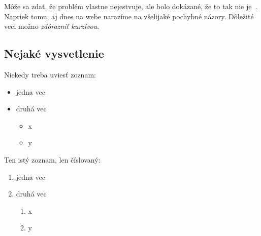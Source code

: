 \documentclass[12pt,twoside,english,a4paper]{article}
\begin{document}
Môže sa zdať, že problém vlastne nejestvuje, ale bolo dokázané, že to tak nie je~. Napriek tomu, aj dnes na webe narazíme na všelijaké pochybné názory\cite{PLP-Framework}. Dôležité veci možno \emph{zdôrazniť kurzívou}.


\subsection{Nejaké vysvetlenie} \label{ina:nejake}

Niekedy treba uviesť zoznam:

\begin{itemize}
\item jedna vec
\item druhá vec
	\begin{itemize}
	\item x
	\item y
	\end{itemize}
\end{itemize}

Ten istý zoznam, len číslovaný:

\begin{enumerate}
\item jedna vec
\item druhá vec
	\begin{enumerate}
	\item x
	\item y
	\end{enumerate}
\end{enumerate}




\end{document}

